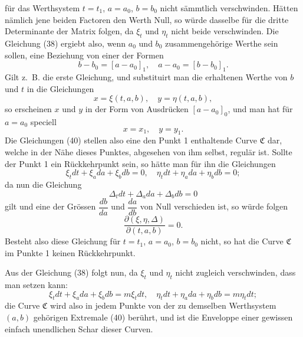 \documentclass[11pt,a4paper,leqno]{article}
\begin{document}
für das Werthsystem $t=t_1$, $a=a_0$, $b=b_0$ nicht sämmtlich verschwinden. Hätten nämlich jene beiden Factoren den Werth Null, so würde dasselbe für die dritte Determinante der Matrix folgen, da $\xi_t$ und $\eta_t$ nicht beide verschwinden. Die Gleichung (38) ergiebt also, wenn $a_0$ und $b_0$ zusammengehörige Werthe sein sollen, eine Beziehung von einer der Formen
\[
b-b_0=[a-a_0]_1,\quad a-a_0=[b-b_0]_1.
\]
Gilt z.~B. die erste Gleichung, und substituirt man die erhaltenen Werthe von $b$ und $t$ in die Gleichungen
\begin{equation}\tag{40}
x=\xi(t,a,b),\quad y=\eta(t,a,b),
\end{equation}
so erscheinen $x$ und $y$ in der Form von Ausdrücken $[a-a_0]_0$, und man hat für $a=a_0$ speciell
\[
x=x_1,\quad y=y_1.
\]
Die Gleichungen (40) stellen also eine den Punkt 1 enthaltende Curve $\mathfrak{C}$ dar, welche in der Nähe dieses Punktes, abgesehen von
ihm selbst, regulär ist. Sollte der Punkt 1 ein Rückkehrpunkt sein, so hätte man für ihn die Gleichungen
\[
\xi_tdt+\xi_a da+\xi_b db=0,\quad \eta_tdt+\eta_a da+\eta_b db=0;
\]
da nun die Gleichung
\[
\Delta_tdt+\Delta_a da+\Delta_b db=0
\]
gilt und eine der Grössen $\dfrac{db}{da}$ und $\dfrac{da}{db}$ von Null verschieden ist, so würde folgen
\begin{equation}\tag{41}
\frac{\partial(\xi,\eta,\Delta)}{\partial(t,a,b)}=0.
\end{equation}
Besteht also diese Gleichung für $t=t_1$, $a=a_0$, $b=b_0$ nicht, so hat die Curve $\mathfrak{C}$ im Punkte 1 keinen Rückkehrpunkt.

Aus der Gleichung (38) folgt nun, da $\xi_t$ und $\eta_t$ nicht zugleich verschwinden, dass man setzen kann:
\begin{equation}\tag{42}
\xi_tdt+\xi_a da+\xi_b db=m\xi_tdt,\quad
\eta_tdt+\eta_a da+\eta_b db=m\eta_tdt;
\end{equation}
die Curve $\mathfrak{C}$ wird also in jedem Punkte von der zu demselben Werthsystem $(a,b)$ gehörigen Extremale (40) berührt, und ist die Enveloppe einer gewissen einfach unendlichen Schar dieser Curven.
\end{document}
